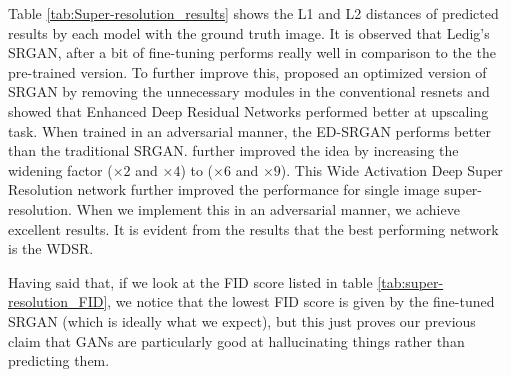 \documentclass{article} %
\begin{document}
    Table \ref{tab:Super-resolution_results} shows the L1 and L2 distances of predicted results by each model with the ground truth image. It is observed that Ledig's SRGAN, after a bit of fine-tuning performs really well in comparison to the the pre-trained version. To further improve this, \cite{lim2017enhanced} proposed an optimized version of SRGAN by removing the unnecessary modules in the conventional resnets and showed that Enhanced Deep Residual Networks performed better at upscaling task. When trained in an adversarial manner, the ED-SRGAN performs better than the traditional SRGAN. \cite{yu2018wide} further improved the idea by increasing the widening factor ($\times 2$ and $\times 4$) to ($\times 6$ and $\times 9$). This Wide Activation Deep Super Resolution network further improved the performance for single image super-resolution. When we implement this in an adversarial manner, we achieve excellent results. It is evident from the results that the best performing network is the WDSR. 
    
    
    Having said that, if we look at the FID score listed in table \ref{tab:super-resolution_FID}, we notice that the lowest FID score is given by the fine-tuned SRGAN (which is ideally what we expect), but this just proves our previous claim that GANs are particularly good at hallucinating things rather than predicting them. 
\end{document}
